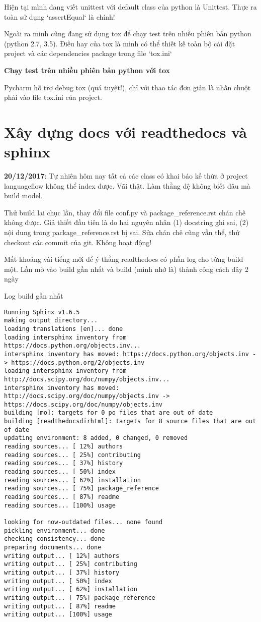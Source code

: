 Hiện tại mình đang viết unittest với default class của python là Unittest. Thực ra toàn sử dụng `assertEqual` là chính!

Ngoài ra mình cũng đang sử dụng tox để chạy test trên nhiều phiên bản python (python 2.7, 3.5). Điều hay của tox là mình có thể thiết kế toàn bộ cài đặt project và các dependencies package trong file `tox.ini`

\textbf{Chạy test trên nhiều phiên bản python với tox}

Pycharm hỗ trợ debug tox (quá tuyệt!), chỉ với thao tác đơn giản là nhấn chuột phải vào file tox.ini của project.

\section{Xây dựng docs với readthedocs và sphinx}

\noindent \textbf{20/12/2017}: Tự nhiên hôm nay tất cả các class có khai báo kế thừa ở project languageflow không thể index được. Vãi thật. Làm thằng đệ không biết đâu mà build model.

Thử build lại chục lần, thay đổi file conf.py và package\_reference.rst chán chê không được. Giả thiết đầu tiên là do hai nguyên nhân (1) docstring ghi sai, (2) nội dung trong package\_reference.rst bị sai. Sửa chán chê cũng vẫn thể, thử checkout các commit của git. Không hoạt động!

Mất khoảng vài tiếng mới để ý thằng readthedocs có phần log cho từng build một. Lần mò vào build gần nhất và build (mình nhớ là) thành công cách đây 2 ngày

\noindent Log build gần nhất

\begin{lstlisting}
Running Sphinx v1.6.5
making output directory...
loading translations [en]... done
loading intersphinx inventory from https://docs.python.org/objects.inv...
intersphinx inventory has moved: https://docs.python.org/objects.inv -> https://docs.python.org/2/objects.inv
loading intersphinx inventory from http://docs.scipy.org/doc/numpy/objects.inv...
intersphinx inventory has moved: http://docs.scipy.org/doc/numpy/objects.inv -> https://docs.scipy.org/doc/numpy/objects.inv
building [mo]: targets for 0 po files that are out of date
building [readthedocsdirhtml]: targets for 8 source files that are out of date
updating environment: 8 added, 0 changed, 0 removed
reading sources... [ 12%] authors
reading sources... [ 25%] contributing
reading sources... [ 37%] history
reading sources... [ 50%] index
reading sources... [ 62%] installation
reading sources... [ 75%] package_reference
reading sources... [ 87%] readme
reading sources... [100%] usage

looking for now-outdated files... none found
pickling environment... done
checking consistency... done
preparing documents... done
writing output... [ 12%] authors
writing output... [ 25%] contributing
writing output... [ 37%] history
writing output... [ 50%] index
writing output... [ 62%] installation
writing output... [ 75%] package_reference
writing output... [ 87%] readme
writing output... [100%] usage
\end{lstlisting}

